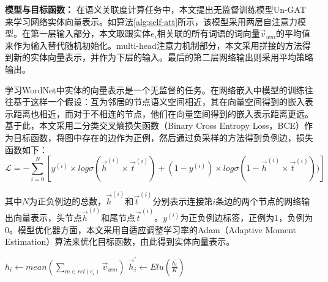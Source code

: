 \textbf{模型与目标函数：}
在语义关联度计算任务中，本文提出无监督训练模型Un-GAT来学习网络实体向量表示。如算法\ref{alg:self-att}所示，该模型采用两层自注意力模型。在第一层输入部分，本文取跟实体$e_i$相关联的所有词语的词向量$\vec v_{wm}$的平均值来作为输入替代随机初始化。multi-head注意力机制部分，本文采用拼接的方法得到新的实体向量表示，并作为下层的输入。最后的第二层网络输出则采用平均策略输出。

学习WordNet中实体的向量表示是一个无监督的任务。在网络嵌入中模型的训练往往基于这样一个假设：互为邻居的节点语义空间相近，其在向量空间得到的嵌入表示距离也相近，而对于不相连的节点，他们在向量空间得到的嵌入表示距离更远。基于此，本文采用二分类交叉熵损失函数（Binary Cross Entropy Loss，BCE）作为目标函数，将图中存在的边作为正例，然后通过负采样的方法得到负例边，损失函数如下：
\begin{equation}
    \mathcal{L} = -\sum_{i = 0}^{N} [y^{(i)} \times log\sigma(\vec h^{(i)} \times \vec t^{(i)})+(1 - y_{}^{(i)})\times log\sigma(1 - \vec h^{(i)} \times \vec t^{(i)}))]
    \label{wordnet_loss}
\end{equation}

\noindent 其中$N$为正负例边的总数，$\vec h^{(i)}$和$\vec t^{(i)}$分别表示连接第$i$条边的两个节点的网络输出向量表示，头节点$\vec h^{(i)}$和尾节点$\vec t^{(i)}$。$y^{(i)}$为正负例边标签，正例为1，负例为0。模型优化器方面，本文采用自适应调整学习率的Adam（Adaptive Moment Estimation）算法来优化目标函数，由此得到实体向量表示。

\begin{algorithm}
    \label{alg:self-att}
    $h_i \leftarrow mean(\sum_{m \in rel(e_i)} \vec v_{wm})$ \;
    $\vec h_i^{'} \leftarrow Elu(\frac{h_i^{'}}{K})$
\end{algorithm}

